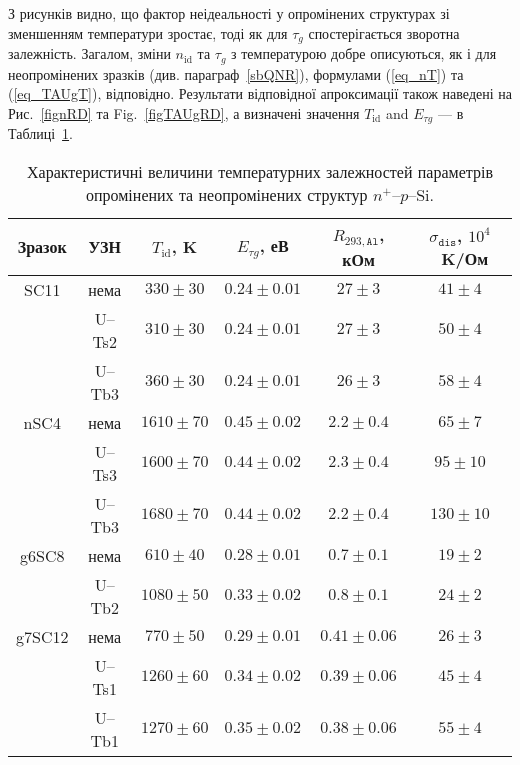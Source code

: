 З рисунків видно, що фактор неідеальності у опромінених структурах зі зменшенням температури зростає,
тоді як для $\tau_{g}$ спостерігається зворотна залежність.
Загалом, зміни $n_{\mathrm{id}}$ та $\tau_{g}$ з температурою добре описуються, як і для неопромінених зразків (див. параграф~\ref{sbQNR}),
 формулами (\ref{eq_nT}) та
(\ref{eq_TAUgT}), відповідно.
Результати відповідної апроксимації також наведені на Рис.~\ref{fignRD} та Fig.~\ref{figTAUgRD},
а визначені значення $T_{\mathrm{id}}$ and $E_{\tau g}$ --- в Таблиці~\ref{tabSSCparRD}.

\begin{table}
\caption{\label{tabSSCparRD}Характеристичні величини температурних залежностей параметрів опромінених та неопромінених
структур $n^+$--$p$--Si.
}
\begin{tabular}{|c|c|c|c|c|c|} \hline
Зразок&УЗН&$T_{\mathrm{id}}$, K&$E_{\tau g}$, еВ&$R_{293,\mathtt{Al}}$, кОм&$\sigma_{\mathtt{dis}}$, $10^4$~K/Ом\\
\hline
SC11&нема&$330\pm30$&$0.24\pm0.01$&$27\pm3$&$41\pm4$\\ \hline
&U--Ts2&$310\pm30$&$0.24\pm0.01$&$27\pm3$&$50\pm4$\\ \hline
&U--Tb3&$360\pm30$&$0.24\pm0.01$&$26\pm3$&$58\pm4$\\ \hline
nSC4&нема&$1610\pm70$&$0.45\pm0.02$&$2.2\pm0.4$&$65\pm7$\\ \hline
&U--Ts3&$1600\pm70$&$0.44\pm0.02$&$2.3\pm0.4$&$95\pm10$\\ \hline
&U--Tb3&$1680\pm70$&$0.44\pm0.02$&$2.2\pm0.4$&$130\pm10$\\ \hline
g6SC8&нема&$610\pm40$&$0.28\pm0.01$&$0.7\pm0.1$&$19\pm2$\\ \hline
&U--Tb2&$1080\pm50$&$0.33\pm0.02$&$0.8\pm0.1$&$24\pm2$\\ \hline
g7SC12&нема&$770\pm50$&$0.29\pm0.01$&$0.41\pm0.06$&$26\pm3$\\ \hline
&U--Ts1&$1260\pm60$&$0.34\pm0.02$&$0.39\pm0.06$&$45\pm4$\\ \hline
&U--Tb1&$1270\pm60$&$0.35\pm0.02$&$0.38\pm0.06$&$55\pm4$\\ \hline
\end{tabular}
\end{table}

